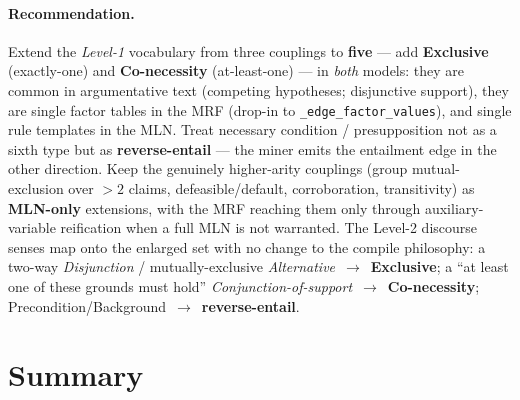 \documentclass[11pt]{article}
\begin{document}
\paragraph{Recommendation.} Extend the \emph{Level-1} vocabulary from three couplings to
\textbf{five} --- add \textbf{Exclusive} (exactly-one) and \textbf{Co-necessity}
(at-least-one) --- in \emph{both} models: they are common in argumentative text (competing
hypotheses; disjunctive support), they are single factor tables in the MRF (drop-in to
\texttt{\_edge\_factor\_values}), and single rule templates in the MLN. Treat necessary
condition / presupposition not as a sixth type but as \textbf{reverse-entail} --- the miner
emits the entailment edge in the other direction. Keep the genuinely higher-arity couplings
(group mutual-exclusion over $>2$ claims, defeasible/default, corroboration, transitivity) as
\textbf{MLN-only} extensions, with the MRF reaching them only through auxiliary-variable
reification when a full MLN is not warranted. The Level-2 discourse senses map onto the
enlarged set with no change to the compile philosophy: a two-way \emph{Disjunction} /
mutually-exclusive \emph{Alternative}~$\to$~\textbf{Exclusive}; a ``at least one of these
grounds must hold'' \emph{Conjunction-of-support}~$\to$~\textbf{Co-necessity};
Precondition/Background~$\to$~\textbf{reverse-entail}.

\section{Summary}
\label{sec:summary}
\end{document}
